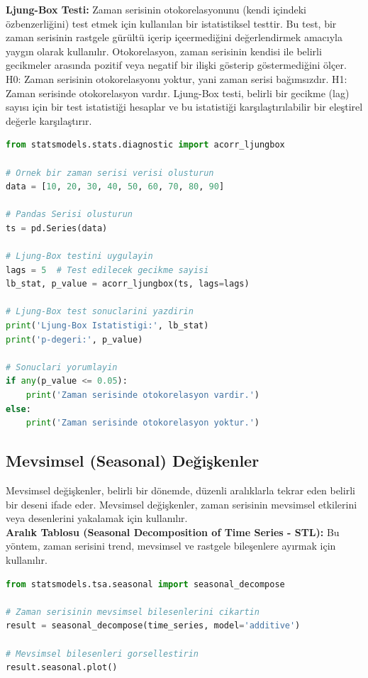 \textbf{Ljung-Box Testi:} Zaman serisinin otokorelasyonunu (kendi içindeki özbenzerliğini) test etmek için kullanılan bir istatistiksel testtir. Bu test, bir zaman serisinin rastgele gürültü içerip içeermediğini değerlendirmek amacıyla yaygın olarak kullanılır. Otokorelasyon, zaman serisinin kendisi ile belirli gecikmeler arasında pozitif veya negatif bir ilişki gösterip göstermediğini ölçer. H0: Zaman serisinin otokorelasyonu yoktur, yani zaman serisi bağımsızdır. H1: Zaman serisinde otokorelasyon vardır. Ljung-Box testi, belirli bir gecikme (lag) sayısı için bir test istatistiği hesaplar ve bu istatistiği karşılaştırılabilir bir eleştirel değerle karşılaştırır.

\begin{lstlisting}[language=Python]
from statsmodels.stats.diagnostic import acorr_ljungbox

# Ornek bir zaman serisi verisi olusturun
data = [10, 20, 30, 40, 50, 60, 70, 80, 90]

# Pandas Serisi olusturun
ts = pd.Series(data)

# Ljung-Box testini uygulayin
lags = 5  # Test edilecek gecikme sayisi
lb_stat, p_value = acorr_ljungbox(ts, lags=lags)

# Ljung-Box test sonuclarini yazdirin
print('Ljung-Box Istatistigi:', lb_stat)
print('p-degeri:', p_value)

# Sonuclari yorumlayin
if any(p_value <= 0.05):
    print('Zaman serisinde otokorelasyon vardir.')
else:
    print('Zaman serisinde otokorelasyon yoktur.')
\end{lstlisting}

\subsection{Mevsimsel (Seasonal) Değişkenler}
Mevsimsel değişkenler, belirli bir dönemde, düzenli aralıklarla tekrar eden belirli bir deseni ifade eder. Mevsimsel değişkenler, zaman serisinin mevsimsel etkilerini veya desenlerini yakalamak için kullanılır.\\
\textbf{Aralık Tablosu (Seasonal Decomposition of Time Series - STL):} Bu yöntem, zaman serisini trend, mevsimsel ve rastgele bileşenlere ayırmak için kullanılır.

\begin{lstlisting}[language=Python]
from statsmodels.tsa.seasonal import seasonal_decompose

# Zaman serisinin mevsimsel bilesenlerini cikartin
result = seasonal_decompose(time_series, model='additive')

# Mevsimsel bilesenleri gorsellestirin
result.seasonal.plot()
\end{lstlisting}

